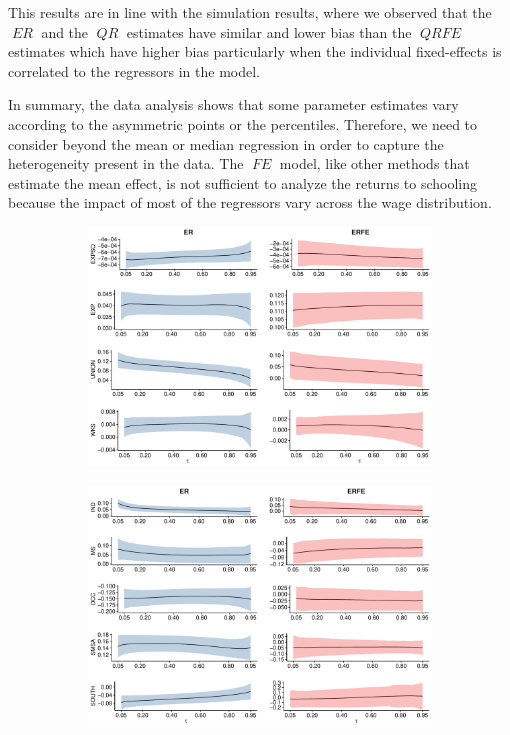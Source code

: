 \documentclass[15pt,a4paper]{article}
\DeclareMathOperator{\QRFE}{\textit{QRFE}}
\DeclareMathOperator{\ER}{\textit{ER}}
\DeclareMathOperator{\QR}{\textit{QR}}
\DeclareMathOperator{\FE}{\textit{FE}}
\begin{document}
This results are in line with the simulation results, where we observed that the $\ER$ and the $\QR$ estimates have similar and lower bias than the $\QRFE$ estimates which have higher bias particularly when the individual fixed-effects is correlated to the regressors in the model.    


In summary, the data analysis shows that some parameter estimates vary according to the asymmetric points or the percentiles. Therefore, we need to consider beyond the mean or median regression in order to capture the heterogeneity present in the data. The $\FE$ model, like other methods that estimate the mean effect, is not sufficient to analyze the returns to schooling because the impact of most of the regressors vary across the wage distribution. 


\begin{figure}
     \centering
     \begin{subfigure}[b]{0.49\textwidth}
         \centering
         \includegraphics[width=\textwidth]{Graph_main/cross1_er_erfe1}
         \caption{}
         \label{fig:cross1_er_erfe1}
     \end{subfigure}
     \hfill
     \begin{subfigure}[b]{0.49\textwidth}
         \centering
         \includegraphics[width=\textwidth]{Graph_main/cross1_er_erfe2}

\end{subfigure}
\end{figure}
\end{document}
